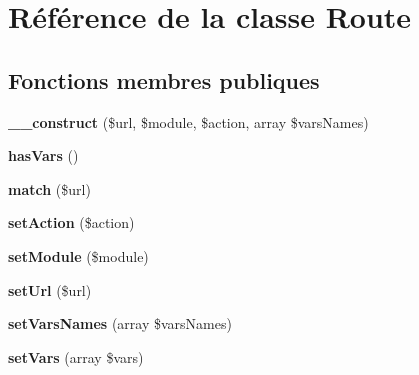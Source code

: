 \hypertarget{class_library_1_1_route}{\section{Référence de la classe Route}
\label{class_library_1_1_route}
}
\subsection*{Fonctions membres publiques}
\begin{DoxyCompactItemize}
\item 
\hypertarget{class_library_1_1_route_a8ffaba4bd0e9f5ec8b18e43e8cf0f711}{{\bfseries \+\_\+\+\_\+construct} (\$url, \$module, \$action, array \$vars\+Names)}\label{class_library_1_1_route_a8ffaba4bd0e9f5ec8b18e43e8cf0f711}

\item 
\hypertarget{class_library_1_1_route_acabce7173ed84c4ccd599ee1850ee8d5}{{\bfseries has\+Vars} ()}\label{class_library_1_1_route_acabce7173ed84c4ccd599ee1850ee8d5}

\item 
\hypertarget{class_library_1_1_route_abd724f6a6c6ad25275026dede10a1495}{{\bfseries match} (\$url)}\label{class_library_1_1_route_abd724f6a6c6ad25275026dede10a1495}

\item 
\hypertarget{class_library_1_1_route_a0366b3b0db0bd90abfc461c372f86599}{{\bfseries set\+Action} (\$action)}\label{class_library_1_1_route_a0366b3b0db0bd90abfc461c372f86599}

\item 
\hypertarget{class_library_1_1_route_a19ce94bf700387486bfc97366dc934e3}{{\bfseries set\+Module} (\$module)}\label{class_library_1_1_route_a19ce94bf700387486bfc97366dc934e3}

\item 
\hypertarget{class_library_1_1_route_a0b6d0c531aa70b1811b166299edab8d0}{{\bfseries set\+Url} (\$url)}\label{class_library_1_1_route_a0b6d0c531aa70b1811b166299edab8d0}

\item 
\hypertarget{class_library_1_1_route_a78a15a15abb8e2d9ba20c695c0d9750c}{{\bfseries set\+Vars\+Names} (array \$vars\+Names)}\label{class_library_1_1_route_a78a15a15abb8e2d9ba20c695c0d9750c}

\item 
\hypertarget{class_library_1_1_route_a1dd1370145e5beb2b793fd2addbee348}{{\bfseries set\+Vars} (array \$vars)}\label{class_library_1_1_route_a1dd1370145e5beb2b793fd2addbee348}


\end{DoxyCompactItemize}
